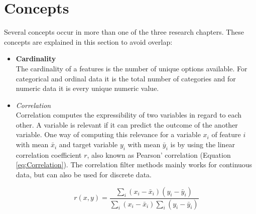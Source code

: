 \documentclass[10pt,a4paper]{report}
\begin{document}
	\section{Concepts}
	\label{PLsec:Concepts}
	
	Several concepts occur in more than one of the three research chapters. These concepts are explained in this section to avoid overlap:
	
	\begin{itemize}
		\item \textbf{Cardinality} \\
		The cardinality of a features is the number of unique options available. For categorical and ordinal data it is the total number of categories and for numeric data it is every unique numeric value.
		\item \textit{Correlation} \\
		Correlation computes the expressibility of two variables in regard to each other. A variable is relevant if it can predict the outcome of the another variable. One way of computing this relevance for a variable $x_i$ of feature $i$ with mean $\bar{x }_i$ and target variable $y_i$ with mean $\bar{y}_i$ is by using the linear correlation coefficient $r$, also known as Pearson' correlation\cite{yu2003feature} (Equation \ref{eq:Correlation}). The correlation filter methods mainly works for continuous data, but can also be used for discrete data\cite{hall2000correlation}.
		
		\begin{equation}\label{eq:Correlation}
		r(x,y) = \frac{\sum_{i}(x_i - \bar{x}_i)(y_i -\bar{y}_i)}{\sum_{i}(x_i - \bar{x}_i)\sum_{i}(y_i -\bar{y}_i)}
		\end{equation}
		

\end{itemize}
\end{document}
